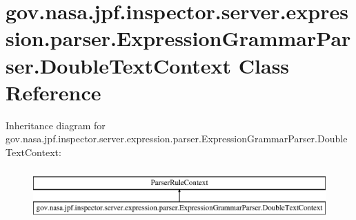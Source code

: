 \hypertarget{classgov_1_1nasa_1_1jpf_1_1inspector_1_1server_1_1expression_1_1parser_1_1_expression_grammar_parser_1_1_double_text_context}{}\section{gov.\+nasa.\+jpf.\+inspector.\+server.\+expression.\+parser.\+Expression\+Grammar\+Parser.\+Double\+Text\+Context Class Reference}
\label{classgov_1_1nasa_1_1jpf_1_1inspector_1_1server_1_1expression_1_1parser_1_1_expression_grammar_parser_1_1_double_text_context}
Inheritance diagram for gov.\+nasa.\+jpf.\+inspector.\+server.\+expression.\+parser.\+Expression\+Grammar\+Parser.\+Double\+Text\+Context\+:\begin{figure}[H]
\begin{center}
\leavevmode
\includegraphics[height=2.000000cm]{classgov_1_1nasa_1_1jpf_1_1inspector_1_1server_1_1expression_1_1parser_1_1_expression_grammar_parser_1_1_double_text_context}
\end{center}
\end{figure}

